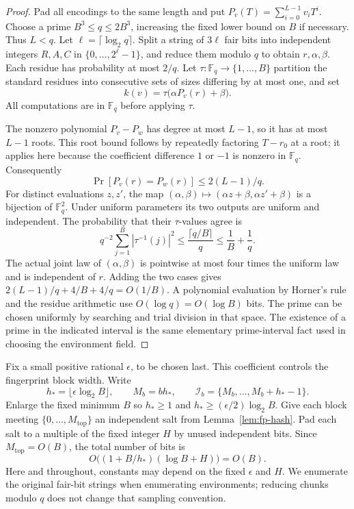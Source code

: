 \begin{proof}
Pad all encodings to the same length and put
$P_v(T)=\sum_{i=0}^{L-1}v_iT^i$.  Choose a prime
$B^3\le q\le2B^3$, increasing the fixed lower bound on $B$ if necessary.
Thus $L<q$.  Let $\ell=\lceil\log_2q\rceil$.  Split a string of $3\ell$
fair bits into independent integers $R,A,C$ in $\{0,\ldots,2^\ell-1\}$,
and reduce them modulo $q$ to obtain $r,\alpha,\beta$.  Each residue has
probability at most $2/q$.  Let
$\tau:\mathbb F_q\longrightarrow\{1,\ldots,B\}$ partition the standard
residues into consecutive sets of sizes differing by at most one, and set
\[
 k(v)=\tau\bigl(\alpha P_v(r)+\beta\bigr).
\]
All computations are in $\mathbb F_q$ before applying $\tau$.

The nonzero polynomial $P_v-P_w$ has degree at most $L-1$, so it has at most
$L-1$ roots.  This root bound follows by repeatedly factoring $T-r_0$ at a
root; it applies here because the coefficient difference $1$ or $-1$ is
nonzero in $\mathbb F_q$.  Consequently
\[
 \Pr[P_v(r)=P_w(r)]\le 2(L-1)/q.
\]
For distinct evaluations $z,z'$, the map
$(\alpha,\beta)\mapsto(\alpha z+\beta,\alpha z'+\beta)$ is a bijection
of $\mathbb F_q^2$.  Under uniform parameters its two outputs are uniform
and independent.  The probability that their $\tau$-values agree is
\[
 q^{-2}\sum_{j=1}^B|\tau^{-1}(j)|^2
 \le \frac{\lceil q/B\rceil}{q}\le\frac1B+\frac1q.
\]
The actual joint law of $(\alpha,\beta)$ is pointwise at most four times
the uniform law and is independent of $r$.  Adding the two cases gives
$2(L-1)/q+4/B+4/q=O(1/B)$.  A polynomial evaluation by Horner's rule and
the residue arithmetic use $O(\log q)=O(\log B)$ bits.  The prime can be
chosen uniformly by searching and trial division in that space.  The
existence of a prime in the indicated interval is the same elementary
prime-interval fact used in choosing the environment field.
\end{proof}

Fix a small positive rational $\epsilon$, to be chosen last.
This coefficient controls the fingerprint block width. Write
\begin{equation}
 h_*=\lfloor\epsilon\log_2 B\rfloor,\qquad
 M_b=bh_*,\qquad
 \mathcal I_b=\{M_b,\ldots,M_b+h_*-1\}.
 \label{eq:fp-blocks}
\end{equation}
Enlarge the fixed minimum $B$ so $h_*\ge1$ and
$h_*\ge(\epsilon/2)\log_2B$.  Give each block meeting
$\{0,\ldots,M_{\mathrm{top}}\}$ an independent salt from
Lemma~\ref{lem:fp-hash}.  Pad each salt to a multiple of the fixed integer
$H$ by unused independent bits.  Since $M_{\mathrm{top}}=O(B)$, the total
number of bits is
\begin{equation}
 O\bigl((1+B/h_*)(\log B+H)\bigr)=O(B).
 \label{eq:fp-salt-space}
\end{equation}
Here and throughout, constants may depend on the fixed $\epsilon$ and $H$.
We enumerate the original fair-bit strings when enumerating environments;
reducing chunks modulo $q$ does not change that sampling convention.

